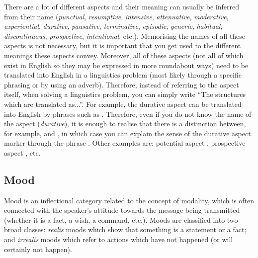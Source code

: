 \begin{refsection}
 There are a lot of different aspects and their meaning can usually be inferred from their name (\textit{punctual}, \textit{resumptive}, \textit{intensive}, \textit{attenuative}, \textit{moderative}, \textit{experiential}, \textit{durative}, \textit{pausative}, \textit{terminative}, \textit{episodic}, \textit{generic}, \textit{habitual}, \textit{discontinuous}, \textit{prospective}, \textit{intentional}, etc.). Memorising the names of all these aspects is not necessary, but it is important that you get used to the different meanings these aspects convey. Moreover, all of these aspects (not all of which exist in English so they may be expressed in more roundabout ways) need to be translated into English in a linguistics problem (most likely through a specific phrasing or by using an adverb). Therefore, instead of referring to the aspect itself, when solving a linguistics problem, you can simply write “The structures which are translated as...”. For example, the durative aspect can be translated into English by phrases such as . Therefore, even if you do not know the name of the aspect (\textit{durative}), it is enough to realise that there is a distinction between, for example,  and , in which case you can explain the sense of the durative aspect marker through the phrase . Other examples are: potential aspect , prospective aspect , etc.


\subsection{Mood}

 Mood is an inflectional category related to the concept of modality, which is often connected with the speaker's attitude towards the message being transmitted (whether it is a fact, a wish, a command, etc.). Moods are classified into two broad classes: \textit{realis} moods which show that something is a statement or a fact; and \textit{irrealis} moods which refer to actions which have not happened (or will certainly not happen).


\end{refsection}
